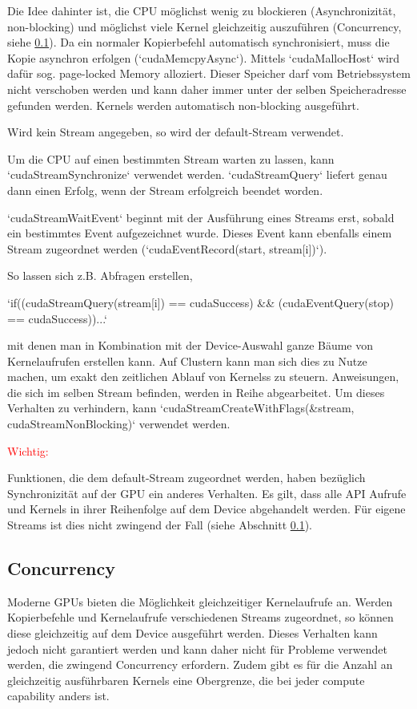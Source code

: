 		Die Idee dahinter ist, die CPU möglichst wenig zu blockieren (Asynchronizität, non-blocking) und möglichst viele \Gls{Kernel} gleichzeitig auszuführen (Concurrency, siehe \ref{async}). Da ein normaler Kopierbefehl automatisch synchronisiert, muss die Kopie asynchron erfolgen (\li`cudaMemcpyAsync`). Mittels \li`cudaMallocHost` wird dafür sog. \gls{page-locked Memory} alloziert. Dieser Speicher darf vom Betriebssystem nicht verschoben werden und kann daher immer unter der selben Speicheradresse gefunden werden. \Glspl{Kernel} werden automatisch non-blocking ausgeführt.
		
		Wird kein \Gls{Stream} angegeben, so wird der default-\Gls{Stream} verwendet.
		
		Um die CPU auf einen bestimmten \Gls{Stream} warten zu lassen, kann \li`cudaStreamSynchronize` verwendet werden. \li`cudaStreamQuery` liefert genau dann einen Erfolg, wenn der \Gls{Stream} erfolgreich beendet worden.	
		
		\li`cudaStreamWaitEvent` beginnt mit der Ausführung eines \Glspl{Stream} erst, sobald ein bestimmtes Event aufgezeichnet wurde. Dieses Event kann ebenfalls einem \Gls{Stream} zugeordnet werden (\li`cudaEventRecord(start, stream[i])`).
		
		So lassen sich z.B. Abfragen erstellen,
		
		\li`if((cudaStreamQuery(stream[i]) == cudaSuccess) && (cudaEventQuery(stop) == cudaSuccess))...`
		
		mit denen man in Kombination mit der Device-Auswahl ganze Bäume von \Gls{Kernel}aufrufen erstellen kann. Auf Clustern kann man sich dies zu Nutze machen, um exakt den zeitlichen Ablauf von \Glspl{Kernel}s zu steuern. Anweisungen, die sich im selben \Gls{Stream} befinden, werden in Reihe abgearbeitet. Um dieses Verhalten zu verhindern, kann \li`cudaStreamCreateWithFlags(&stream, cudaStreamNonBlocking)` verwendet werden.
		
		\textcolor{red}{Wichtig:}
		
		Funktionen, die dem default-\Gls{Stream} zugeordnet werden, haben bezüglich Synchronizität auf der GPU ein anderes Verhalten. Es gilt, dass alle \Gls{API} Aufrufe und \Glspl{Kernel} in ihrer Reihenfolge auf dem Device abgehandelt werden. Für eigene \Glspl{Stream} ist dies nicht zwingend der Fall (siehe Abschnitt \ref{async}).
		
		\subsection{Concurrency}\label{async}
		Moderne GPUs bieten die Möglichkeit gleichzeitiger \Gls{Kernel}aufrufe an. Werden Kopierbefehle und Kernelaufrufe verschiedenen \Glspl{Stream} zugeordnet, so können diese gleichzeitig auf dem Device ausgeführt werden. Dieses Verhalten kann jedoch nicht garantiert werden und kann daher nicht für Probleme verwendet werden, die zwingend Concurrency erfordern. Zudem gibt es für die Anzahl an gleichzeitig ausführbaren \Glspl{Kernel} eine Obergrenze, die bei jeder \Gls{compute capability} anders ist.
		
